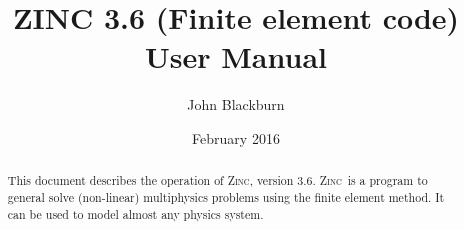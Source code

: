 \documentclass[a4paper,twoside,11pt]{book}
\begin{document}
\newcommand{\vecc}[1]{\mbox{\boldmath $#1$}}
\renewcommand{\vec}[1]{\mathbf{#1}}
\renewcommand{\d}{\partial}
\renewcommand{\t}[1]{\mathrm{#1}}
\renewcommand{\div}{\nabla\cdot}

\newcommand{\grad}{\nabla}
\newcommand{\curl}{\nabla\times}
\newcommand{\eq}[1]{(\ref{#1})}
\newcommand{\f}[1]{Figure \ref{#1}}
\newcommand{\tab}[1]{Table \ref{#1}}
\newcommand{\sect}[1]{Section \ref{#1}}
\newcommand{\chap}[1]{Chapter \ref{#1}}
\newcommand{\dee}{\mathrm{d}}
\newcommand{\dd}[2]{\left(\frac{\d #1}{\d #2}\right)}
\newcommand{\ddd}[3]{\left(\frac{\d #1}{\d #2}\right)_{#3}}
\newcommand{\tensor}[1]{\underline{\underline{#1}}}
\newcommand{\emf}{\mathcal{E}}
\newcommand{\caf}{\textbf{C}, \textbf{a}, \textbf{f}}
\newcommand{\qg}{\textbf{q}, \textbf{g}}
\newcommand{\zinc}{\textsc{Zinc}}
\newcommand{\zmesh}{\textsc{Zmesh}}
\newcommand{\zpp}{\textsc{Zpp}}
\newcommand{\uv}[1]{{\underline{#1}}}
\newcommand{\var}[1]{\texttt{#1}}

\NPLnumber{}

\title{ZINC 3.6 (Finite element code)\\User Manual} 

\author{John Blackburn} 
\date{February 2016}
\makecover
\maketitle

\begin{abstract}
This document describes the operation of \zinc, version 3.6. \zinc\ is
a program to general solve (non-linear) multiphysics problems using the finite
element method. It can be used to model almost any physics system.
\end{abstract}

\begin{prelude}\tableofcontents\end{prelude}
\end{document}
